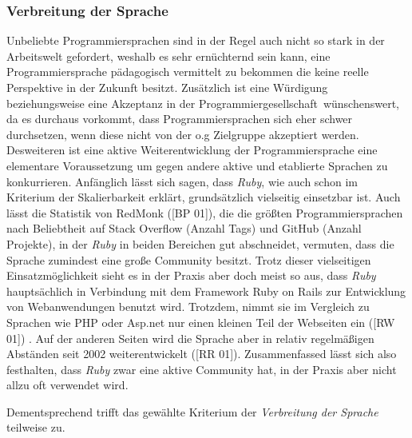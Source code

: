 \documentclass[12pt,DIV=14, version=first, BCOR=10mm,a4paper,twoside,parskip=half-,headsepline,headinclude]{scrartcl}
\begin{document}
\subsubsection{Verbreitung der Sprache}
\begin{flushleft}
Unbeliebte Programmiersprachen sind in der Regel auch nicht so stark in der Arbeitswelt gefordert, weshalb es sehr ernüchternd sein kann, eine Programmiersprache pädagogisch vermittelt zu bekommen die keine reelle Perspektive in der Zukunft besitzt. Zusätzlich ist eine Würdigung beziehungsweise eine Akzeptanz in der \glqq Programmiergesellschaft\grqq \, wünschenswert, da es durchaus vorkommt, dass Programmiersprachen sich eher schwer durchsetzen, wenn diese nicht von der o.g Zielgruppe akzeptiert werden. Desweiteren ist eine aktive Weiterentwicklung der Programmiersprache eine elementare Voraussetzung um gegen andere aktive und etablierte Sprachen zu konkurrieren.
Anfänglich lässt sich sagen, dass \textit{\glqq Ruby\grqq}, wie auch schon im Kriterium der Skalierbarkeit erklärt, grundsätzlich vielseitig einsetzbar ist. Auch lässt die Statistik von {\glqq RedMonk\grqq} ([BP 01]), die die größten Programmiersprachen nach Beliebtheit auf {\glqq Stack Overflow\grqq} (Anzahl Tags) und GitHub (Anzahl Projekte), in der \textit{\glqq Ruby\grqq} in beiden Bereichen gut abschneidet, vermuten, dass die Sprache zumindest eine große Community besitzt. Trotz dieser vielseitigen Einsatzmöglichkeit sieht es in der Praxis aber doch meist so aus, dass \textit{\glqq Ruby\grqq} hauptsächlich in Verbindung mit dem Framework {\glqq Ruby on Rails\grqq} zur Entwicklung von Webanwendungen benutzt wird. Trotzdem, nimmt sie im Vergleich zu Sprachen wie {\glqq PHP\grqq} oder {\glqq Asp.net\grqq} nur einen kleinen Teil der Webseiten ein ([RW 01]) . Auf der anderen Seiten wird die Sprache aber in relativ regelmäßigen Abständen seit 2002 weiterentwickelt ([RR 01]). Zusammenfassed lässt sich also festhalten, dass \textit{\glqq Ruby\grqq} zwar eine aktive Community hat, in der Praxis aber nicht allzu oft verwendet wird.

Dementsprechend trifft das gewählte Kriterium der \textit{Verbreitung der Sprache} teilweise zu.
\end{flushleft}
\end{document}
